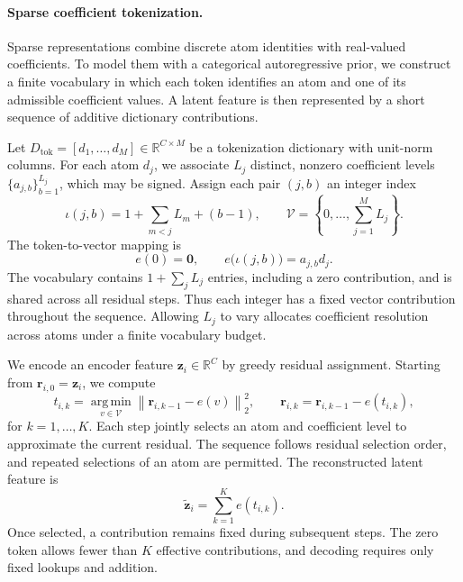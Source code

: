 
\paragraph{Sparse coefficient tokenization.}
Sparse representations combine discrete atom identities with real-valued coefficients. To model them with a categorical autoregressive prior, we construct a finite vocabulary in which each token identifies an atom and one of its admissible coefficient values. A latent feature is then represented by a short sequence of additive dictionary contributions.

Let $D_{\mathrm{tok}}=[d_1,\ldots,d_M]\in\mathbb{R}^{C\times M}$ be a tokenization dictionary with unit-norm columns. For each atom $d_j$, we associate $L_j$ distinct, nonzero coefficient levels $\{a_{j,b}\}_{b=1}^{L_j}$, which may be signed. Assign each pair $(j,b)$ an integer index
\begin{equation}
    \iota(j,b)=1+\sum_{m<j}L_m+(b-1),
    \qquad
    \mathcal{V}=\left\{0,\ldots,\sum_{j=1}^{M}L_j\right\}.
\end{equation}
The token-to-vector mapping is
\begin{equation}
    e(0)=\boldsymbol{0},
    \qquad
    e\bigl(\iota(j,b)\bigr)=a_{j,b}d_j.
    \label{eq:token-contribution}
\end{equation}
The vocabulary contains $1+\sum_j L_j$ entries, including a zero contribution, and is shared across all residual steps. Thus each integer has a fixed vector contribution throughout the sequence. Allowing $L_j$ to vary allocates coefficient resolution across atoms under a finite vocabulary budget.

We encode an encoder feature $\boldsymbol{z}_i\in\mathbb{R}^{C}$ by greedy residual assignment. Starting from $\boldsymbol{r}_{i,0}=\boldsymbol{z}_i$, we compute
\begin{equation}
    t_{i,k}
    =\underset{v\in\mathcal{V}}{\operatorname{arg\,min}}
      \left\|\boldsymbol{r}_{i,k-1}-e(v)\right\|_2^2,
    \qquad
    \boldsymbol{r}_{i,k}
    =\boldsymbol{r}_{i,k-1}-e(t_{i,k}),
    \label{eq:token-assignment}
\end{equation}
for $k=1,\ldots,K$. Each step jointly selects an atom and coefficient level to approximate the current residual. The sequence follows residual selection order, and repeated selections of an atom are permitted. The reconstructed latent feature is
\begin{equation}
    \widetilde{\boldsymbol{z}}_i
    =\sum_{k=1}^{K}e(t_{i,k}).
    \label{eq:token-reconstruction}
\end{equation}
Once selected, a contribution remains fixed during subsequent steps. The zero token allows fewer than $K$ effective contributions, and decoding requires only fixed lookups and addition.

